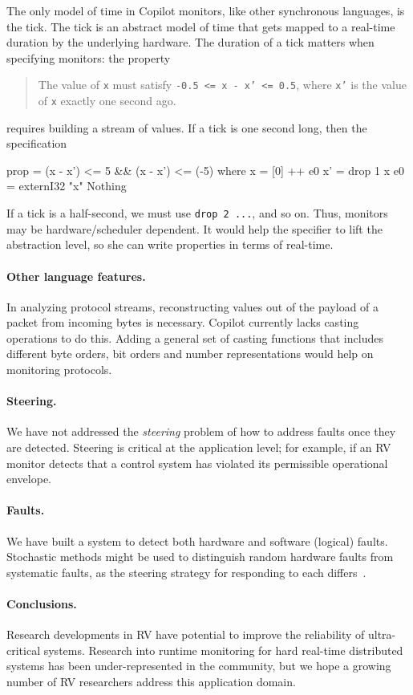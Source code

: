 The only model of time in Copilot monitors, like other synchronous languages, is
the tick.  The tick is an abstract model of time that gets mapped to a real-time
duration by the underlying hardware.  The duration of a tick matters when
specifying monitors: the property
%
\begin{quote}
The value of {\tt x} must satisfy {\tt -0.5
  <= x - x' <= 0.5}, where {\tt x'} is the value of {\tt x} exactly one second ago.
\end{quote}
%
\noindent
requires building a stream of values.  If a tick is one second long, then the
specification
%
\begin{code}
prop = (x - x') <= 5 && (x - x') <= (-5)
  where
  x  = [0] ++ e0 
  x' = drop 1 x
  e0 = externI32 "x" Nothing
\end{code}
%
\noindent
If a tick is a half-second, we must use {\tt drop 2 ...}, and so on.  Thus,
monitors may be hardware/scheduler dependent.  It would help the specifier to
lift the abstraction level, so she can write properties in terms of real-time.

\paragraph{Other language features.}
In analyzing protocol streams, reconstructing values out of the payload of
a packet from incoming bytes is necessary. Copilot currently lacks casting
operations to do this. Adding a general set of casting functions that includes
different byte orders, bit orders and number representations would help on
monitoring protocols.

\paragraph{Steering.}
We have not addressed the \emph{steering} problem of how to address faults once
they are detected.  Steering is critical at the application level; for example,
if an RV monitor detects that a control system has violated its permissible
operational envelope.

\paragraph{Faults.}
We have built a system to detect both hardware and software (logical) faults.
Stochastic methods might be used to distinguish random hardware faults from
systematic faults, as the steering strategy for responding to each
differs~\cite{SammapunLS05}.

\paragraph{Conclusions.}
Research developments in RV have potential to improve the reliability of
ultra-critical systems.  Research into runtime monitoring for hard real-time
distributed systems has been under-represented in the community, but we hope a
growing number of RV researchers address this application domain.
